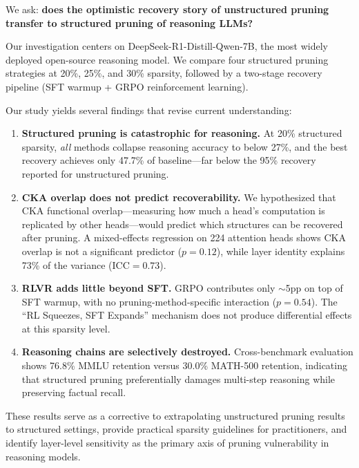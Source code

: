 \documentclass[11pt,a4paper]{article}
\begin{document}
We ask: \textbf{does the optimistic recovery story of unstructured pruning transfer to structured pruning of reasoning LLMs?}

Our investigation centers on DeepSeek-R1-Distill-Qwen-7B, the most widely deployed open-source reasoning model.
We compare four structured pruning strategies at 20\%, 25\%, and 30\% sparsity, followed by a two-stage recovery pipeline (SFT warmup + GRPO reinforcement learning).

Our study yields several findings that revise current understanding:

\begin{enumerate}
\item \textbf{Structured pruning is catastrophic for reasoning.} At 20\% structured sparsity, \emph{all} methods collapse reasoning accuracy to below 27\%, and the best recovery achieves only 47.7\% of baseline---far below the 95\% recovery reported for unstructured pruning.

\item \textbf{CKA overlap does not predict recoverability.} We hypothesized that CKA functional overlap---measuring how much a head's computation is replicated by other heads---would predict which structures can be recovered after pruning.
A mixed-effects regression on 224 attention heads shows CKA overlap is not a significant predictor ($p=0.12$), while layer identity explains 73\% of the variance (ICC$=0.73$).

\item \textbf{RLVR adds little beyond SFT.} GRPO contributes only $\sim$5pp on top of SFT warmup, with no pruning-method-specific interaction ($p=0.54$).
The ``RL Squeezes, SFT Expands'' mechanism does not produce differential effects at this sparsity level.

\item \textbf{Reasoning chains are selectively destroyed.} Cross-benchmark evaluation shows 76.8\% MMLU retention versus 30.0\% MATH-500 retention, indicating that structured pruning preferentially damages multi-step reasoning while preserving factual recall.
\end{enumerate}

These results serve as a corrective to extrapolating unstructured pruning results to structured settings, provide practical sparsity guidelines for practitioners, and identify layer-level sensitivity as the primary axis of pruning vulnerability in reasoning models.

\end{document}
